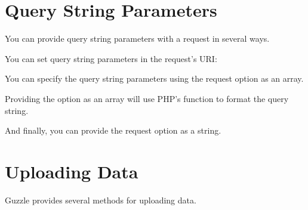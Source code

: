 \documentclass[a4paper,11pt,spanish]{sphinxmanual}
\begin{document}
\chapter{Query String Parameters}
\label{\detokenize{quickstart:query-string-parameters}}
You can provide query string parameters with a request in several ways.

You can set query string parameters in the request's URI:

\begin{sphinxVerbatim}[commandchars=\\\{\}]
   
\end{sphinxVerbatim}

You can specify the query string parameters using the  request
option as an array.

\begin{sphinxVerbatim}[commandchars=\\\{\}]
  \PYG{p}{[}
      \PYG{p}{[}  \PYG{p}{]}
\PYG{p}{]);}
\end{sphinxVerbatim}

Providing the option as an array will use PHP's  function
to format the query string.

And finally, you can provide the  request option as a string.

\begin{sphinxVerbatim}[commandchars=\\\{\}]
  \PYG{p}{[}  \PYG{p}{]);}
\end{sphinxVerbatim}


\chapter{Uploading Data}
\label{\detokenize{quickstart:uploading-data}}
Guzzle provides several methods for uploading data.
\end{document}
